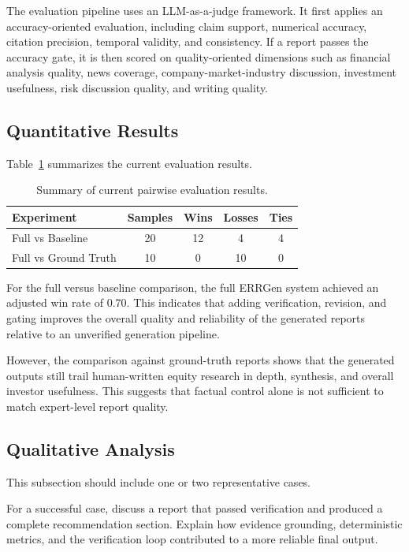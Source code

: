 \documentclass[11pt,a4paper]{article}
\begin{document}
The evaluation pipeline uses an LLM-as-a-judge framework. It first applies an
accuracy-oriented evaluation, including claim support, numerical accuracy,
citation precision, temporal validity, and consistency. If a report passes the
accuracy gate, it is then scored on quality-oriented dimensions such as
financial analysis quality, news coverage, company-market-industry discussion,
investment usefulness, risk discussion quality, and writing quality.

\subsection{Quantitative Results}
Table~\ref{tab:main-results} summarizes the current evaluation results.

\begin{table}[H]
\centering
\begin{tabular}{lcccc}
\toprule
Experiment & Samples & Wins & Losses & Ties \\
\midrule
Full vs Baseline & 20 & 12 & 4 & 4 \\
Full vs Ground Truth & 10 & 0 & 10 & 0 \\
\bottomrule
\end{tabular}
\caption{Summary of current pairwise evaluation results.}
\label{tab:main-results}
\end{table}

For the full versus baseline comparison, the full ERRGen system achieved an
adjusted win rate of 0.70. This indicates that adding verification, revision,
and gating improves the overall quality and reliability of the generated
reports relative to an unverified generation pipeline.

However, the comparison against ground-truth reports shows that the generated
outputs still trail human-written equity research in depth, synthesis, and
overall investor usefulness. This suggests that factual control alone is not
sufficient to match expert-level report quality.

\subsection{Qualitative Analysis}
This subsection should include one or two representative cases.

For a successful case, discuss a report that passed verification and produced a
complete recommendation section. Explain how evidence grounding, deterministic
metrics, and the verification loop contributed to a more reliable final output.
\end{document}
